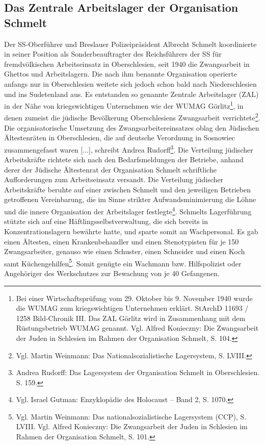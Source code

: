 \subsection{Das Zentrale Arbeitslager der Organisation Schmelt}
Der SS-Oberführer und Breslauer Polizeipräsident Albrecht Schmelt koordinierte in seiner Position als \glqq Sonderbeauftragter des Reichsführers der SS für fremdvölkischen Arbeitseinsatz in Oberschlesien\grqq, seit 1940 die Zwangsarbeit in Ghettos und Arbeitslagern. Die nach ihm benannte Organisation operierte anfangs nur in Oberschlesien weitete sich jedoch schon bald nach Niederschlesien und ins Sudetenland aus. Es entstanden so genannte Zentrale Arbeitslager (ZAL) in der Nähe von kriegswichtigen Unternehmen wie der WUMAG Görlitz\footnote{Bei einer Wirtschaftsprüfung vom 29. Oktober bis 9. November 1940 wurde die WUMAG zum kriegswichtigen Unternehmen erklärt. StArchD 11693 / 1258 Bild-Chronik III. Das ZAL Görlitz wird in Zusammenhang mit dem Rüstungsbetrieb WUMAG genannt. Vgl. Alfred Konieczny: Die Zwangsarbeit der Juden in Schlesien im Rahmen der Organisation Schmelt, S. 104.}, in denen zumeist die jüdische Bevölkerung Oberschlesiens Zwangsarbeit verrichtete\footnote{Vgl. Martin Weinmann: Das Nationalsozialistische Lagersystem, S. LVIII.}. \glqq Die organisatorische Umsetzung des Zwangsarbeitereinsatzes oblag den Jüdischen Ältestenräten in Oberschlesien, die auf deutsche Verordnung in Sosnowiec zusammengefasst waren [...]\grqq, schreibt Andrea Rudorff\footnote{Andrea Rudorff: Das Lagersystem der Organisation Schmelt in Oberschlesien. S. 159.}. Die Verteilung jüdischer Arbeitskräfte richtete sich nach den Bedarfsmeldungen der Betriebe, anhand derer der Jüdische Ältestenrat der Organisation Schmelt schriftliche Aufforderungen zum Arbeitseinsatz versandt. Die Verteilung jüdischer Arbeitskräfte beruhte auf einer zwischen Schmelt und den jeweiligen Betrieben getroffenen Vereinbarung, die im Sinne strikter Aufwandsminimierung die Löhne und die innere Organisation der Arbeitslager festlegte\footnote{Vgl. Israel Gutman: Enzyklopädie des Holocaust -- Band 2, S. 1070.}. Schmelts Lagerführung stützte sich auf eine Häftlingsselbstverwaltung, die sich bereits in Konzentrationslagern bewährte hatte, und sparte somit an Wachpersonal. Es gab einen Ältesten, einen Krankenbehandler und einen Stenotypisten für je 150 Zwangsarbeiter, genauso wie einen Schuster, einen Schneider und einen Koch samt Küchengehilfen\footnote{Vgl. Martin Weinmann: Das nationalsozialistische Lagersystem (CCP), S. LVIII. Vgl. Alfred Konieczny: Die Zwangsarbeit der Juden in Schlesien im Rahmen der Organisation Schmelt, S. 101.}. Somit genügte ein Wachmann bzw. Hilfspolizist oder Angehöriger des Werkschutzes zur Bewachung von je 40 Gefangenen.
